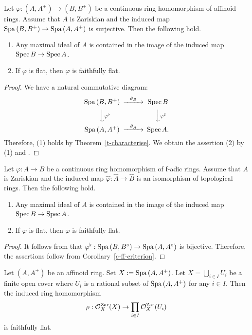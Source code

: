 \begin{cor}\label{c-ff-criterion}
Let $\varphi:(A, A^+) \to (B, B^+)$ be a continuous ring homomorphism 
of affinoid rings. 
Assume that $A$ is Zariskian and 
the induced map ${\operatorname{Spa}}\,(B, B^+) \to {\operatorname{Spa}}\,(A, A^+)$ is surjective. 
Then the following hold. 
\begin{enumerate}
\item 
Any maximal ideal of $A$ is contained in the image of 
the induced map ${\operatorname{Spec}}\,B \to {\operatorname{Spec}}\,A$. 
\item 
If $\varphi$ is flat, then $\varphi$ is faithfully flat. 
\end{enumerate}
\end{cor}

\begin{proof}
We have a natural commutative diagram: 
$$\begin{CD}
\Spa\,(B, B^+) @>\theta_B >> \Spec\,B\\
@VV\varphi^{\flat}V @VV\varphi^{\sharp}V\\
\Spa\,(A, A^+) @>\theta_A >> \Spec\,A.
\end{CD}$$
Therefore, (1) holds by Theorem~\ref{t-characterise}. 
We obtain the assertion (2) by (1) and \cite[Theorem 7.3(ii)]{Mat89}. 
\end{proof}



\begin{cor}\label{c-ff-cplt}
Let $\varphi:A \to B$ be a continuous ring homomorphism 
of f-adic rings. 
Assume that $A$ is Zariskian and 
the induced map $\widehat{\varphi}:\widehat{A} \to \widehat{B}$ 
is an isomorphism of topological rings. 
Then the following hold. 
\begin{enumerate}
\item 
Any maximal ideal of $A$ is contained in the image of 
the induced map ${\operatorname{Spec}}\,B \to {\operatorname{Spec}}\,A$. 
\item 
If $\varphi$ is flat, then $\varphi$ is faithfully flat. 
\end{enumerate}
\end{cor}


\begin{proof}
It follows from \cite[Proposition 3.9]{Hub93} that 
$\varphi^{\flat}:{\operatorname{Spa}}\,(B, B^{\circ}) \to {\operatorname{Spa}}\,(A, A^{\circ})$ is bijective. 
Therefore, the assertions follow from Corollary~\ref{c-ff-criterion}. 
\end{proof}



\begin{cor}
Let $(A, A^+)$ be an affinoid ring. 
Set $X:={\operatorname{Spa}}\,(A, A^+)$. 
Let $X=\bigcup_{i \in I} U_i$ be 
a finite open cover where $U_i$ is a rational subset 
of ${\operatorname{Spa}}\,(A, A^+)$ for any $i \in I$. 
Then the induced ring homomorphism 
$$\rho:\mathcal{O}_X^{{\operatorname{Zar}}}(X) \to \prod_{i \in I}\mathcal{O}_X^{{\operatorname{Zar}}}(U_i)$$
is faithfully flat. 
\end{cor}

